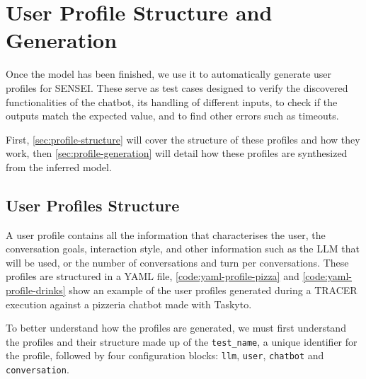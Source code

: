 
\chapter{User Profile Structure and Generation}\label{chapter:user_profiles}

Once the model has been finished,
we use it to automatically generate user profiles for SENSEI.
These serve as test cases designed to verify
the discovered functionalities of the chatbot,
its handling of different inputs,
to check if the outputs match the expected value,
and to find other errors such as timeouts.

First, \autoref{sec:profile-structure}
will cover the structure of these profiles and how they work,
then \autoref{sec:profile-generation}
will detail how these profiles are synthesized from the inferred model.


\section{User Profiles Structure}\label{sec:profile-structure}

A user profile contains all the information
that characterises the user,
the conversation goals,
interaction style,
and other information such as the \ac{LLM} that will be used,
or the number of conversations and turn per conversations.
These profiles are structured in a YAML file,
\autoref{code:yaml-profile-pizza} and \autoref{code:yaml-profile-drinks}
show an example of the user profiles generated during a \ac{TRACER} execution
against a pizzeria chatbot made with Taskyto.







To better understand how the profiles are generated,
we must first understand the profiles and their structure
made up of the \texttt{test\_name},
a unique identifier for the profile,
followed by four configuration blocks: 
\texttt{llm}, \texttt{user}, \texttt{chatbot} and \texttt{conversation}.

